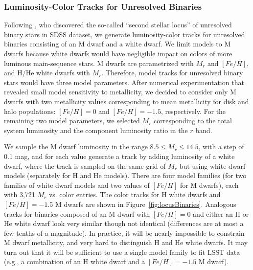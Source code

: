 \subsubsection{Luminosity-Color Tracks for Unresolved Binaries}

Following \cite{2004ApJ...615L.141S}, who discovered the so-called ``second stellar locus'' of unresolved binary
stars in SDSS dataset, we generate luminosity-color tracks for unresolved binaries consisting of an M dwarf and a white dwarf.
We limit models to M dwarfs because white dwarfs would have negligible impact on colors of more luminous main-sequence stars. 
M dwarfs are parametrized with $M_r$ and $[Fe/H]$, and H/He white dwarfs with $M_r$. Therefore, model tracks for unresolved binary
stars would have three model parameters. After numerical experimentation that revealed small model sensitivity to metallicity, we
decided to consider only M dwarfs with two metallicity values corresponding to mean metallicity for disk and halo populations:
$[Fe/H]=0$ and $[Fe/H]=-1.5$, respectively. For the remaining two model parameters, we selected $M_r$ corresponding to the
total system luminosity and the component luminosity ratio in the $r$ band. 

We sample the M dwarf luminosity in the range $8.5 \le M_r \le 14.5$, with a step of 0.1 mag, and for each value
generate a track by adding luminosity of a white dwarf, where the track is sampled on the same grid of $M_r$ but
using white dwarf models (separately for H and He models). There are four model families (for two families of white dwarf
models and two values of $[Fe/H]$ for M dwarfs), each with 3,721 $M_r$ vs. color entries. The color tracks for H white dwarfs
and $[Fe/H]=-1.5$ M dwarfs are shown in Figure~\ref{fig:locusBinaries}. Analogous tracks for binaries composed of an M dwarf with
$[Fe/H]=0$ and either an H or He white dwarf look very similar though not identical (differences are at most a few tenths
of a magnitude). In practice, it will be nearly impossible to constrain M dwarf metallicity, and very hard to distinguish
H and He white dwarfs. It may turn out that it will be sufficient to use a single model family to fit LSST data (e.g., a
combination of an H white dwarf and a $[Fe/H]=-1.5$ M dwarf). 



